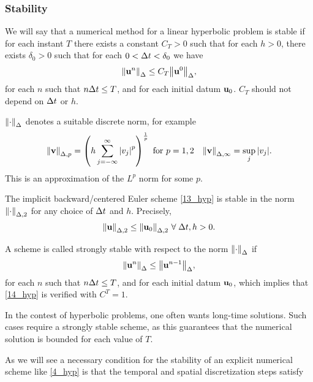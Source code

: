 \subsubsection*{Stability}
We will say that a numerical method for a linear hyperbolic problem is stable if for each instant \(T\) there exists a constant \(C_T > 0\) such that for each \(h>0\), there exists \(\delta_0 > 0\) such that for each \(0 < \Delta t < \delta_0\) we have 
\begin{equation}
    \norm{\textbf{u}^n}_\Delta \leq C_T \norm{\textbf{u}^0}_\Delta, 
    \label{14_hyp}
\end{equation}
for each \(n\) such that \(n\Delta t \leq T\), and for each initial datum \(\textbf{u}_0\). \(C_T\) should not depend on \(\Delta t\) or \(h\).
\begin{notation}
    \(\norm{\cdot}_\Delta\) denotes a suitable discrete norm, for example 
    \begin{equation}
        \norm{\textbf{v}}_{\Delta,p} = \left( h\sum_{j=-\infty}^{\infty} \abs{v_j}^p\right)^{\frac{1}{p}} \text{ for } p = 1,2 \quad \norm{\textbf{v}}_{\Delta,\infty} = \sup_j \abs{v_j}.
        \label{15_hyp}
    \end{equation}
    This is an approximation of the \(L^p\) norm for some \(p\).
\end{notation}
\begin{theorem}
    The implicit backward/centered Euler scheme \eqref{13_hyp} is stable in the norm \(\norm{\cdot}_{\Delta,2}\) for any choice of \(\Delta t\) and \(h\). Precisely,
    \[
        \norm{\textbf{u}}_{\Delta,2} \leq \norm{\textbf{u}_0}_{\Delta,2} \ \forall \; \Delta t, h >0.    
    \]
\end{theorem}
A scheme is called strongly stable with respect to the norm \(\norm{\cdot}_\Delta\) if 
\begin{equation}
    \norm{\textbf{u}^n}_\Delta \leq \norm{\textbf{u}^{n-1}}_\Delta, 
    \label{18_hyp} 
\end{equation}
for each \(n\) such that \(n\Delta t \leq T\), and for each initial datum \(\textbf{u}_0\), which implies that \eqref{14_hyp} is verified with \(C^T=1\).
\begin{remark}
    In the contest of hyperbolic problems, one often wants long-time solutions. Such cases require a strongly stable scheme, as this guarantees that the numerical solution is bounded for each value of \(T\).
\end{remark} 
As we will see a necessary condition for the stability of an explicit numerical scheme like \eqref{4_hyp} is that the temporal and spatial discretization steps satisfy
